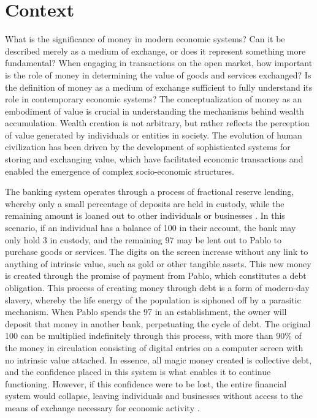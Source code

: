\section{Context}
What is the significance of money in modern economic systems? Can it be described merely as a medium of exchange, or
does it represent something more fundamental? When engaging in transactions on the open market, how important is the
role of money in determining the value of goods and services exchanged? Is the definition of money as a medium of
exchange sufficient to fully understand its role in contemporary economic systems? The conceptualization of money as an
embodiment of value is crucial in understanding the mechanisms behind wealth accumulation. Wealth creation is not
arbitrary, but rather reflects the perception of value generated by individuals or entities in society. The evolution of
human civilization has been driven by the development of sophisticated systems for storing and exchanging value, which
have facilitated economic transactions and enabled the emergence of complex socio-economic structures.

The banking system operates through a process of fractional reserve lending, whereby only a small percentage of deposits
are held in custody, while the remaining amount is loaned out to other individuals or businesses \cite{diamond1983bank}.
In this scenario, if an individual has a balance of 100 in their account, the bank may only hold 3 in custody, and the
remaining 97 may be lent out to Pablo to purchase goods or services. The digits on the screen increase without any link
to anything of intrinsic value, such as gold or other tangible assets. This new money is created through the promise of
payment from Pablo, which constitutes a debt obligation. This process of creating money through debt is a form of
modern-day slavery, whereby the life energy of the population is siphoned off by a parasitic mechanism. When Pablo
spends the 97 in an establishment, the owner will deposit that money in another bank, perpetuating the cycle of debt.
The original 100 can be multiplied indefinitely through this process, with more than 90\% of the money in circulation
consisting of digital entries on a computer screen with no intrinsic value attached. In essence, all magic money created
is collective debt, and the confidence placed in this system is what enables it to continue functioning. However, if
this confidence  were to be lost, the entire financial system would collapse, leaving individuals and businesses without
access to the means of exchange necessary for economic activity \cite{minsky2008stabilizing}.

